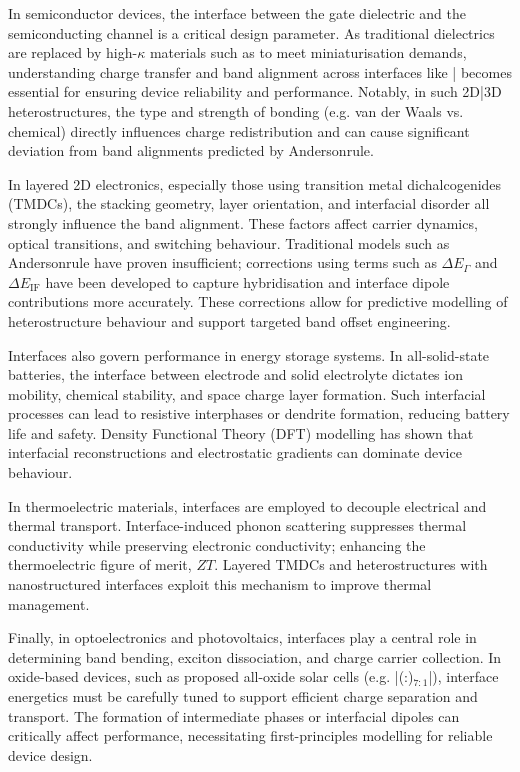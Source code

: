 In semiconductor devices, the interface between the gate dielectric and the semiconducting channel is a critical design parameter. As traditional  dielectrics are replaced by high-$\kappa$ materials such as  to meet miniaturisation demands, understanding charge transfer and band alignment across interfaces like |  becomes essential for ensuring device reliability and performance. Notably, in such 2D|3D heterostructures, the type and strength of bonding (e.g. van der Waals vs. chemical) directly influences charge redistribution and can cause significant deviation from band alignments predicted by Anderson\rqs rule. 
 
In layered 2D electronics, especially those using transition metal dichalcogenides (TMDCs), the stacking geometry, layer orientation, and interfacial disorder all strongly influence the band alignment. These factors affect carrier dynamics, optical transitions, and switching behaviour. Traditional models such as Anderson\rqss rule have proven insufficient; corrections using terms such as $\Delta E_\Gamma$ and $\Delta E_{\text{IF}}$ have been developed to capture hybridisation and interface dipole contributions more accurately. These corrections allow for predictive modelling of heterostructure behaviour and support targeted band offset engineering. 
 
Interfaces also govern performance in energy storage systems. In all-solid-state batteries, the interface between electrode and solid electrolyte dictates ion mobility, chemical stability, and space charge layer formation. Such interfacial processes can lead to resistive interphases or dendrite formation, reducing battery life and safety. Density Functional Theory (DFT) modelling has shown that interfacial reconstructions and electrostatic gradients can dominate device behaviour. 
 
In thermoelectric materials, interfaces are employed to decouple electrical and thermal transport. Interface-induced phonon scattering suppresses thermal conductivity while preserving electronic conductivity; enhancing the thermoelectric figure of merit, $ZT$. Layered TMDCs and heterostructures with nanostructured interfaces exploit this mechanism to improve thermal management. 
 
Finally, in optoelectronics and photovoltaics, interfaces play a central role in determining band bending, exciton dissociation, and charge carrier collection. In oxide-based devices, such as proposed all-oxide solar cells (e.g. |(:)$_{7:1}$|), interface energetics must be carefully tuned to support efficient charge separation and transport. The formation of intermediate phases or interfacial dipoles can critically affect performance, necessitating first-principles modelling for reliable device design. 
 
